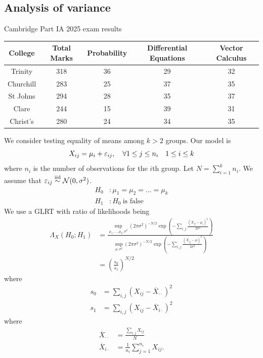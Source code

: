 \documentclass{article}
\newcommand{\iid}{\overset{\text{iid}}{\sim}}
\begin{document}
\subsection{Analysis of variance}
\begin{example}
  Cambridge Part IA 2025 exam results
  \begin{center}
	  \begin{tabular}{|c | c | c c c|}
		  \hline
		  College & Total Marks & Probability & Differential Equations & Vector Calculus \\
		  \hline
		  Trinity & 318 & 36 & 29 & 32 \\
		  Churchill & 283 & 25 & 37 & 35 \\
		  St Johns & 294 & 28 & 35 & 37 \\
		  Clare & 244 & 15 & 39 & 31 \\
		  Christ's & 280 & 24 & 34 & 35 \\
      \hline
    \end{tabular}
  \end{center}
  We consider testing equality of means among $ k>2 $ groups. Our model is
  \[
	  X_{ij} = \mu_i +\varepsilon_{ij}, \quad\forall 1\le j \le n_i \quad 1\le i \le k
  \]
  where $ n_i $ is the number of observations for the $ i $th group. Let $ N=\sum_{i=1}^k n_i $. We assume that $ \ep_{ij}\iid \mathcal N(0,\sigma^2) $.
  \begin{align*}
	  H_0&:\mu_1 = \mu_2 =\dots = \mu_k \\
    H_1&: H_0 \ \text{is false}
  \end{align*}
  We use a GLRT with ratio of likelihoods being
  \begin{align*}
  \Lambda_X(H_0;H_1) &=\frac{\sup_{\mu_1,\dots, \mu_k,\sigma^2}(2\pi \sigma^2)^{-N/2}\exp\left(-\sum_{i,j}\frac{(X_{ij}-\mu_i)^2}{2\sigma^2}\right)}{\sup_{\mu,\sigma^2}(2\pi\sigma^2)^{-N/2}\exp\left(-\sum_{i,j}\frac{(X_{ij}-\mu)^2}{2\sigma^2}\right)}\\
		     &=\left(\frac {s_0}{s_1}\right)^{N/2}
  \end{align*}
  where
  \begin{align*}
	  s_0 &= \sum_{i,j}(X_{ij}-\overline X_{\cdot\cdot})^2\\
	  s_1 &= \sum_{i,j}(X_{ij}-\overline X_{i\cdot})^2
  \end{align*}
  where
  \begin{align*}
	  \overline X_{\cdot\cdot} &= \frac{\sum_{i,j}X_{ij}}{N}\\
	  \overline X_{i\cdot} &= \frac 1{n_i}\sum_{j=1}^{n_i}X_{ij}.

\end{align*}
\end{example}
\end{document}
